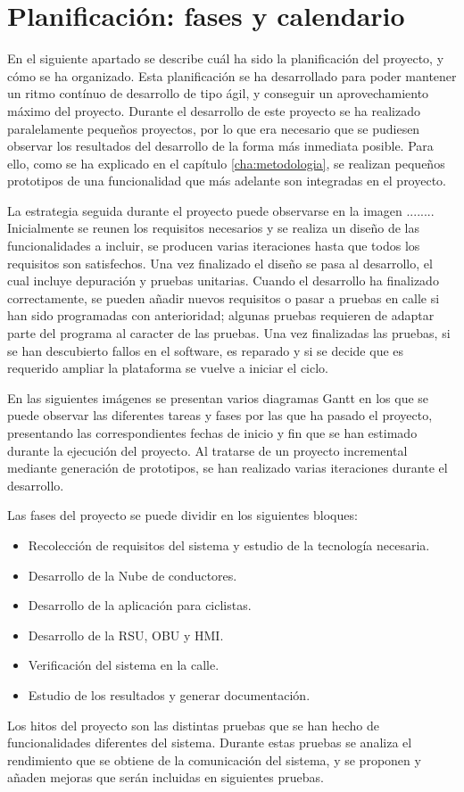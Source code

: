\chapter{Planificación: fases y calendario}
En el siguiente apartado se describe cuál ha sido la planificación del proyecto, y cómo se ha organizado. Esta planificación se ha desarrollado para poder mantener un ritmo contínuo de desarrollo de tipo ágil, y conseguir un aprovechamiento máximo del proyecto. Durante el desarrollo de este proyecto se ha realizado paralelamente pequeños proyectos, por lo que era necesario que se pudiesen observar los resultados del desarrollo de la forma más inmediata posible. Para ello, como se ha explicado en el capítulo \ref{cha:metodologia}, se realizan pequeños prototipos de una funcionalidad que más adelante son integradas en el proyecto.

La estrategia seguida durante el proyecto puede observarse en la imagen ........ Inicialmente se reunen los requisitos necesarios y se realiza un diseño de las funcionalidades a incluir, se producen varias iteraciones hasta que todos los requisitos son satisfechos. Una vez finalizado el diseño se pasa al desarrollo, el cual incluye depuración y pruebas unitarias. Cuando el desarrollo ha finalizado correctamente, se pueden añadir nuevos requisitos o pasar a pruebas en calle si han sido programadas con anterioridad; algunas pruebas requieren de adaptar parte del programa al caracter de las pruebas. Una vez finalizadas las pruebas, si se han descubierto fallos en el software, es reparado y si se decide que es requerido ampliar la plataforma se vuelve a iniciar el ciclo. 

En las siguientes imágenes se presentan varios diagramas Gantt en los que se puede observar las diferentes tareas y fases por las que ha pasado el proyecto, presentando las correspondientes fechas de inicio y fin que se han estimado durante la ejecución del proyecto. Al tratarse de un proyecto incremental mediante generación de prototipos, se han realizado varias iteraciones durante el desarrollo.

Las fases del proyecto se puede dividir en los siguientes bloques:
\begin{itemize}
	\item Recolección de requisitos del sistema y estudio de la tecnología necesaria.
	\item Desarrollo de la Nube de conductores.
	\item Desarrollo de la aplicación para ciclistas.
	\item Desarrollo de la RSU, OBU y HMI.
	\item Verificación del sistema en la calle.
	\item Estudio de los resultados y generar documentación.
\end{itemize}

Los hitos del proyecto son las distintas pruebas que se han hecho de funcionalidades diferentes del sistema. Durante estas pruebas se analiza el rendimiento que se obtiene de la comunicación del sistema, y se proponen y añaden mejoras que serán incluidas en siguientes pruebas.

